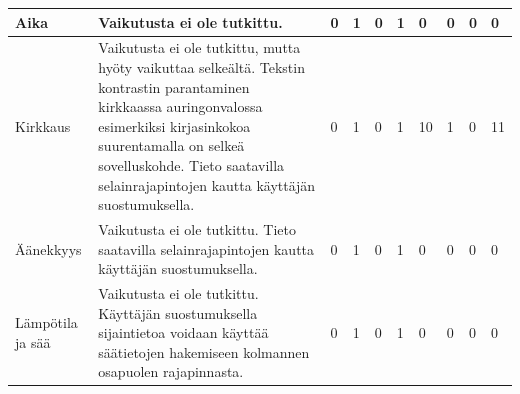 \documentclass[finnish, 12pt, a4paper, elec, utf8, a-1b, online]{aaltothesis}
\begin{document}
{\begin{longtable}{p{2.5cm}|p{6cm}|p{0.5cm}p{0.5cm}p{0.5cm}|p{0.5cm}|p{0.5cm}p{0.5cm}p{0.5cm}|p{0.5cm}|}
        \midrule
        Aika                                   & Vaikutusta ei ole tutkittu.                                                                                                                                                                                                                                   & 0                                          & 1                                   & 0                                      & 1                            & 0                                               & 0                                         & 0                                         & 0                            \\
        \midrule
        Kirkkaus                               & Vaikutusta ei ole tutkittu, mutta hyöty vaikuttaa selkeältä. Tekstin kontrastin parantaminen kirkkaassa auringonvalossa esimerkiksi kirjasinkokoa suurentamalla on selkeä sovelluskohde. Tieto saatavilla selainrajapintojen kautta käyttäjän suostumuksella. & 0                                          & 1                                   & 0                                      & 1                            & 10                                              & 1                                         & 0                                         & 11                           \\
        \midrule
        Äänekkyys                              & Vaikutusta ei ole tutkittu. Tieto saatavilla selainrajapintojen kautta käyttäjän suostumuksella.                                                                                                                                                              & 0                                          & 1                                   & 0                                      & 1                            & 0                                               & 0                                         & 0                                         & 0                            \\
        \midrule
        Lämpötila ja sää                       & Vaikutusta ei ole tutkittu. Käyttäjän suostumuksella sijaintietoa voidaan käyttää säätietojen hakemiseen kolmannen osapuolen rajapinnasta.                                                                                                                    & 0                                          & 1                                   & 0                                      & 1                            & 0                                               & 0                                         & 0                                         & 0                            \\

\end{longtable}}
\end{document}
